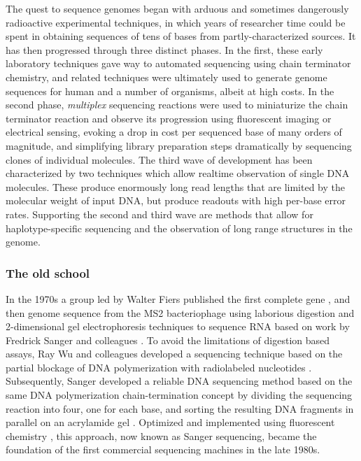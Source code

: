 \documentclass[a4paper,12pt,numbered,oneside]{Classes/PhDThesisPSnPDF}
\begin{document}
The quest to sequence genomes began with arduous and sometimes dangerously radioactive experimental techniques, in which years of researcher time could be spent in obtaining sequences of tens of bases from partly-characterized sources.
It has then progressed through three distinct phases.
In the first, these early laboratory techniques gave way to automated sequencing using chain terminator chemistry, and related techniques were ultimately used to generate genome sequences for human and a number of organisms, albeit at high costs.
In the second phase, \emph{multiplex} sequencing reactions were used to miniaturize the chain terminator reaction and observe its progression using fluorescent imaging or electrical sensing, evoking a drop in cost per sequenced base of many orders of magnitude, and simplifying library preparation steps dramatically by sequencing clones of individual molecules.
The third wave of development has been characterized by two techniques which allow realtime observation of single DNA molecules.
These produce enormously long read lengths that are limited by the molecular weight of input DNA, but produce readouts with high per-base error rates.
Supporting the second and third wave are methods that allow for haplotype-specific sequencing and the observation of long range structures in the genome.

\subsubsection{The old school}

In the 1970s a group led by Walter Fiers published the first complete gene \cite{jou1972nucleotide}, and then genome sequence \cite{fiers1976complete} from the MS2 bacteriophage using laborious digestion and 2-dimensional gel electrophoresis techniques to sequence RNA based on work by Fredrick Sanger and colleagues \cite{sanger1965two, adams1969nucleotide}.
To avoid the limitations of digestion based assays, Ray Wu and colleagues developed a sequencing technique based on the partial blockage of DNA polymerization with radiolabeled nucleotides \cite{wu1972nucleotide, padmanabhan1974chemical}.
Subsequently, Sanger developed a reliable DNA sequencing method based on the same DNA polymerization chain-termination concept by dividing the sequencing reaction into four, one for each base, and sorting the resulting DNA fragments in parallel on an acrylamide gel \cite{sanger1977dna}.
Optimized and implemented using fluorescent chemistry \cite{strauss1986specific}, this approach, now known as Sanger sequencing, became the foundation of the first commercial sequencing machines in the late 1980s.
\end{document}
